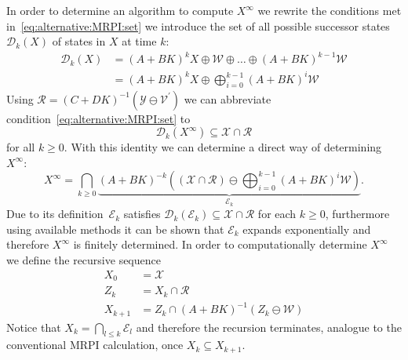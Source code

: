 \documentclass{ifacconf}
\providecommand{\E}{\mathcal E}
\providecommand{\W}{\mathcal W}
\providecommand{\V}{\mathcal V}
\providecommand{\X}{\mathcal X}
\providecommand{\Y}{\mathcal Y}
\providecommand{\R}{\mathcal R}
\providecommand{\D}{\mathscr D}
\begin{document}
In order to determine an algorithm to compute $X^\infty$ we rewrite the conditions met in~\eqref{eq:alternative:MRPI:set} we introduce the set of all possible successor states~$\D_k(X)$ of states in $X$ at time $k$:
%
\begin{equation}\begin{split}
	\D_k(X) &= (A+BK)^{k}X\oplus\W\oplus\dots\oplus(A+BK)^{k-1}\W\\
	&= (A+BK)^k X\oplus \bigoplus_{i=0}^{k-1}(A+BK)^i\W
\end{split}\end{equation}
%
Using $\R = (C+DK)^{-1}(\Y\ominus\V^\prime)$ we can abbreviate condition~\eqref{eq:alternative:MRPI:set} to
%
\begin{equation}\label{eq:containment:condition:alternative:MRPI}
\D_k(X^\infty)\subseteq\X\cap\R
\end{equation}
%
for all $k\geq0$.
%
With this identity we can determine a direct way of determining $X^\infty$:
%
\begin{equation}\label{eq:direct:formulation:MRPI:with:intersection}
	X^\infty = \bigcap_{k\geq0}\underbrace{(A+BK)^{-k}\left((\X\cap\R)\ominus\bigoplus_{i=0}^{k-1}(A+BK)^i\W\right)}_{\E_k}.
\end{equation}
%
Due to its definition~$\E_k$ satisfies $\D_k(\E_k)\subseteq\X\cap\R$ for each $k\geq0$, furthermore using available methods it can be shown that $\E_k$ expands exponentially and therefore $X^\infty$ is finitely determined.
%
In order to computationally determine $X^\infty$ we define the recursive sequence
%
\begin{equation}\label{eq:MRPI:sequence}
	\begin{split}
	X_0 &= \X\\
	Z_k &= X_k\cap\R\\
	X_{k+1} &= Z_k\cap(A+BK)^{-1}(Z_k\ominus\W)
	\end{split}
\end{equation}
%
Notice that $X_k = \bigcap_{l\leq k}\E_l$ and therefore the recursion terminates, analogue to the conventional MRPI calculation, once $X_k\subseteq X_{k+1}$.
\end{document}
